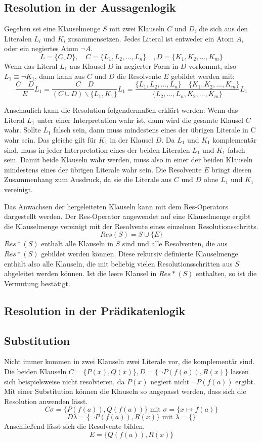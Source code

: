 		\subsection{Resolution in der Aussagenlogik}
Gegeben sei eine Klauselmenge $S$ mit zwei Klauseln $C$ und $D$, die sich aus den Literalen $L_i$ und $K_i$ zusammensetzen. Jedes Literal ist entweder ein Atom $A$, oder ein negiertes Atom $\neg A$.
$$L=\{C,D\}, \quad C=\{L_1, L_2, ..., L_n\}\quad, D=\{K_1, K_2, ..., K_m\}$$
Wenn das Literal $L_1$ aus Klausel $D$ in negierter Form in $D$ vorkommt, also $L_1\equiv\neg K_1$, dann kann aus $C$ und $D$ die Resolvente $E$ gebildet werden mit:
$$\frac{C\quad D}{E}L_1=\frac{C \quad D}{(C \cup D) \backslash \{L_1, K_1\}}L_1
= \frac{\{L_1, L_2, ..., L_n\}\quad\{K_1, K_2, ..., K_m\}}{\{L_2, ..., L_n, K_2, ..., K_m\}}L_1$$

Anschaulich kann die Resolution folgendermaßen erklärt werden: 
Wenn das Literal $L_1$ unter einer Interpretation wahr ist, dann wird die gesamte Klausel $C$ wahr. Sollte $L_1$ falsch sein, dann muss mindestens eines der übrigen Literale in C wahr sein.
Das gleiche gilt für $K_1$ in der Klausel $D$.
Da $L_1$ und $K_1$ komplementär sind, muss in jeder Interpretation eines der beiden Literalen $L_1$ und $K_1$ falsch sein. Damit beide Klauseln wahr werden, muss also in einer der beiden Klauseln mindestens eines der übrigen Literale wahr sein. Die Resolvente $E$ bringt diesen Zusammenhang zum Ausdruck, da sie die Literale aus $C$ und $D$ ohne $L_1$ und $K_1$ vereinigt.

Das Anwachsen der hergeleiteten Klauseln kann mit dem Res-Operators dargestellt werden. Der Res-Operator angewendet auf eine Klauselmenge ergibt die Klauselmenge vereinigt mit der Resolvente eines einzelnen Resolutionsschritts.
$$Res(S)=S \cup \{E\}$$
$Res*(S)$ enthält alle Klauseln in $S$ sind und alle Resolventen, die aus $Res*(S)$ gebildet werden können. Diese rekursiv definierte Klauselmenge enthält also alle Klauseln, die mit beliebig vielen Resolutionsschritten aus $S$ abgeleitet werden können. Ist die leere Klausel in $Res*(S)$ enthalten, so ist die Vermutung bestätigt.
		\subsection{Resolution in der Prädikatenlogik}
		\subsection{Substitution}
Nicht immer kommen in zwei Klauseln zwei Literale vor, die komplementär sind. Die beiden Klauseln $C=\{P(x), Q(x)\}, D=\{\neg P(f(a)), R(x)\}$ lassen sich beispielsweise nicht resolvieren, da $P(x)$ negiert nicht $\neg P(f(a))$ ergibt.
Mit einer Substitution können die Klauseln so angepasst werden, dass sich die Resolution anwenden lässt.
$$C\sigma=\{P(f(a)), Q(f(a))\} \text{ mit } \sigma=\{x \mapsto f(a)\}$$
$$D\lambda=\{\neg P(f(a)), R(x)\} \text{ mit } \lambda=\{\}$$
Anschließend lässt sich die Resolvente bilden.
$$E=\{Q(f(a)), R(x)\}$$
